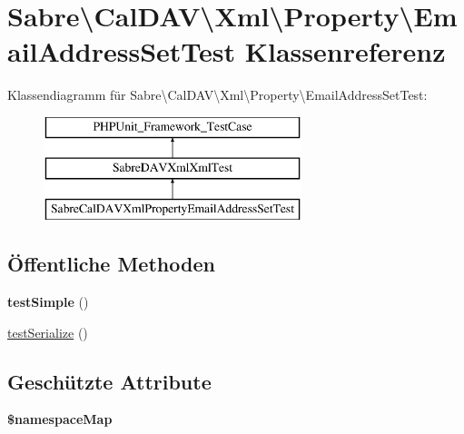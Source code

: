 \hypertarget{class_sabre_1_1_cal_d_a_v_1_1_xml_1_1_property_1_1_email_address_set_test}{}\section{Sabre\textbackslash{}Cal\+D\+AV\textbackslash{}Xml\textbackslash{}Property\textbackslash{}Email\+Address\+Set\+Test Klassenreferenz}
\label{class_sabre_1_1_cal_d_a_v_1_1_xml_1_1_property_1_1_email_address_set_test}
Klassendiagramm für Sabre\textbackslash{}Cal\+D\+AV\textbackslash{}Xml\textbackslash{}Property\textbackslash{}Email\+Address\+Set\+Test\+:\begin{figure}[H]
\begin{center}
\leavevmode
\includegraphics[height=3.000000cm]{class_sabre_1_1_cal_d_a_v_1_1_xml_1_1_property_1_1_email_address_set_test}
\end{center}
\end{figure}
\subsection*{Öffentliche Methoden}
\begin{DoxyCompactItemize}
\item 
\mbox{\label{class_sabre_1_1_cal_d_a_v_1_1_xml_1_1_property_1_1_email_address_set_test_a31d61ad2bbf48a519a289d887ca24963}} 
{\bfseries test\+Simple} ()
\item 
\mbox{\hyperlink{class_sabre_1_1_cal_d_a_v_1_1_xml_1_1_property_1_1_email_address_set_test_adacf6934494b88006e1479c0c1aefcc5}{test\+Serialize}} ()
\end{DoxyCompactItemize}
\subsection*{Geschützte Attribute}
\begin{DoxyCompactItemize}
\item 
{\bfseries \$namespace\+Map}
\end{DoxyCompactItemize}


